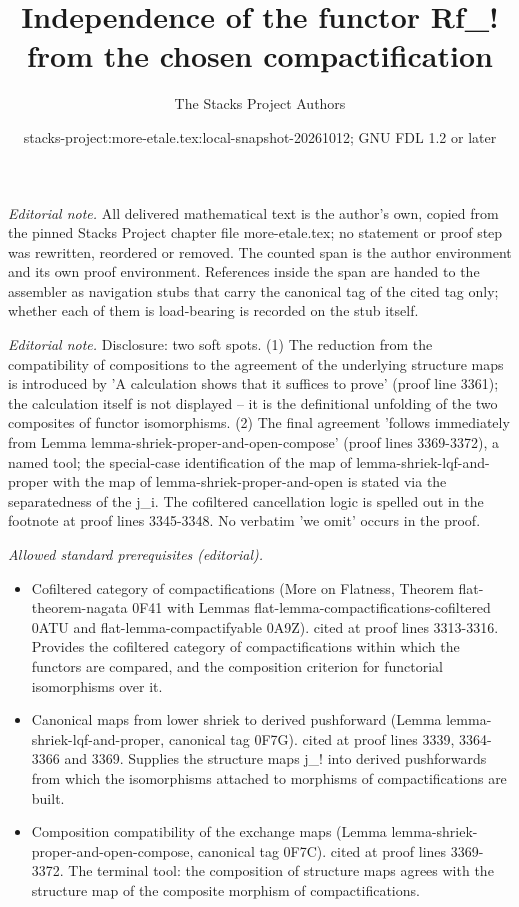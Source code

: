 \documentclass{stacks-project}
\title{Independence of the functor Rf\_! from the chosen compactification}
\author{The Stacks Project Authors}
\date{stacks-project:more-etale.tex:local-snapshot-20261012; GNU FDL 1.2 or later}
\theoremstyle{plain}
\theoremstyle{definition}
\theoremstyle{remark}
\numberwithin{equation}{subsection}
\begin{document}
\maketitle
\setcounter{subsection}{1}
\noindent\textit{Editorial note.} All delivered mathematical text is the author's own, copied from the pinned Stacks Project chapter file more-etale.tex; no statement or proof step was rewritten, reordered or removed. The counted span is the author environment and its own proof environment. References inside the span are handed to the assembler as navigation stubs that carry the canonical tag of the cited tag only; whether each of them is load-bearing is recorded on the stub itself.\par\medskip
\noindent\textit{Editorial note.} Disclosure: two soft spots. (1) The reduction from the compatibility of compositions to the agreement of the underlying structure maps is introduced by 'A calculation shows that it suffices to prove' (proof line 3361); the calculation itself is not displayed -- it is the definitional unfolding of the two composites of functor isomorphisms. (2) The final agreement 'follows immediately from Lemma lemma-shriek-proper-and-open-compose' (proof lines 3369-3372), a named tool; the special-case identification of the map of lemma-shriek-lqf-and-proper with the map of lemma-shriek-proper-and-open is stated via the separatedness of the j\_i. The cofiltered cancellation logic is spelled out in the footnote at proof lines 3345-3348. No verbatim 'we omit' occurs in the proof.\par\medskip
\noindent\textit{Allowed standard prerequisites (editorial).}\begin{itemize}
\item Cofiltered category of compactifications (More on Flatness, Theorem flat-theorem-nagata 0F41 with Lemmas flat-lemma-compactifications-cofiltered 0ATU and flat-lemma-compactifyable 0A9Z). cited at proof lines 3313-3316. Provides the cofiltered category of compactifications within which the functors are compared, and the composition criterion for functorial isomorphisms over it.
\item Canonical maps from lower shriek to derived pushforward (Lemma lemma-shriek-lqf-and-proper, canonical tag 0F7G). cited at proof lines 3339, 3364-3366 and 3369. Supplies the structure maps j\_! into derived pushforwards from which the isomorphisms attached to morphisms of compactifications are built.
\item Composition compatibility of the exchange maps (Lemma lemma-shriek-proper-and-open-compose, canonical tag 0F7C). cited at proof lines 3369-3372. The terminal tool: the composition of structure maps agrees with the structure map of the composite morphism of compactifications.
\end{itemize}\medskip
\end{document}
